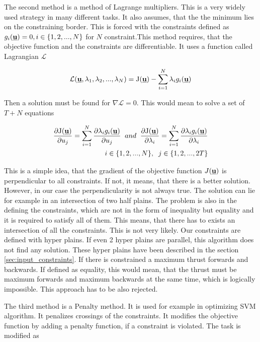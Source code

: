 \documentclass[a4paper,11pt,titlepage]{article}
\newcommand{\Lagr}{\mathcal{L}}
\newcommand{\uvec}{\textbf{\underline{u}}}
\begin{document}
The second method is a method of Lagrange multipliers. This is a very widely used strategy in many different tasks. It also assumes, that the the minimum lies on the constraining border. This is forced with the constraints defined as $g_i(\uvec) = 0, i \in \{1, 2, ..., N\}$ for $N$ constraint.This method requires, that the objective function and the constraints are differentiable. It uses a function called Lagrangian $\Lagr$

\begin{equation}
\label{Lagrangian}
\Lagr(\uvec, \lambda_1, \lambda_2, ..., \lambda_N) = \mathrm{J}(\uvec) - \sum_{i = 1}^N \lambda_i g_i(\uvec)
\end{equation}

Then a solution must be found for $\nabla \Lagr = 0$. This would mean to solve a set of $T + N$ equations 

\begin{equation}
\label{Lagrangian}
\begin{split}
\frac{\partial \mathrm{J(\uvec)}}{\partial u_j} =  \sum_{i = 1}^N \frac{\partial \lambda_i g_i(\uvec) }{\partial u_j} \;\; and \;\;\frac{\partial \mathrm{J(\uvec)}}{\partial \lambda_i} =  \sum_{i = 1}^N \frac{\partial \lambda_i g_i(\uvec) }{\partial \lambda_i}\\
i \in \{1, 2, ..., N\},\;\;j \in \{1, 2, ..., 2T\}
\end{split}
\end{equation}

This is a simple idea, that the gradient of the objective function $J(\uvec)$ is perpendicular to all constraints. If not, it means, that there is a better solution. However, in our case the perpendicularity is not always true. The solution can lie for example in an intersection of two half plains. The problem is also in the defining the constraints, which are not in the form of inequality but equality and it is required to satisfy all of them. This means, that there has to exists an intersection of all the constraints. This is not very likely. Our constraints are defined with hyper plains. If even 2 hyper plains are parallel, this algorithm does not find any solution. These hyper plains have been described in the section \ref{sec:input_constraints}. If there is constrained a maximum thrust forwards and backwards. If defined as equality, this would mean, that the thrust must be maximum forwards and maximum backwards at the same time, which is logically impossible. This approach has to be also rejected.

The third method is a Penalty method. It is used for example in optimizing SVM algorithm. It penalizes crossings of the constraints. It modifies the objective function by adding a penalty function, if a constraint is violated. The task is modified as 
\end{document}

